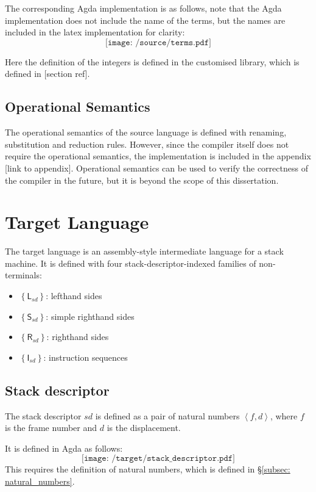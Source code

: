 \documentclass[12pt,twoside,a4paper]{report}
\theoremstyle{definition}
\theoremstyle{definition}
\theoremstyle{definition}
\theoremstyle{definition}
\newcommand{\secref}[1]{\S\ref{#1}}
\newcommand{\bracket}[1]{\left\{ #1 \right\}}
\newcommand{\ang}[1]{\left\langle #1 \right\rangle}
\begin{document}
        The corresponding Agda implementation is as follows, note that the Agda implementation does not include the name of the terms, but the names are included in the latex implementation for clarity:
        \[\texttt{[image: /source/terms.pdf]}\]

        Here the definition of the integers is defined in the customised library, which is defined in [section ref].

        \subsection{Operational Semantics}
        The operational semantics of the source language is defined with renaming, substitution and reduction rules. However, since the compiler itself does not require the operational semantics, the implementation is included in the appendix [link to appendix]. Operational semantics can be used to verify the correctness of the compiler in the future, but it is beyond the scope of this dissertation.


    \section{Target Language}
    The target language is an assembly-style intermediate language for a stack machine. It is defined with four stack-descriptor-indexed families of non-terminals: 
    \begin{itemize}
        \item 
            $\bracket{\textsf{L}_{sd}}$: lefthand sides
        \item 
            $\bracket{\textsf{S}_{sd}}$: simple righthand sides
        \item
            $\bracket{\textsf{R}_{sd}}$: righthand sides
        \item
            $\bracket{\textsf{I}_{sd}}$: instruction sequences
    \end{itemize}

    \subsection{Stack descriptor}
    The stack descriptor $sd$ is defined as a pair of natural numbers $\ang{f, d}$, where $f$ is the frame number and $d$ is the displacement. 

    It is defined in Agda as follows:
    \[\texttt{[image: /target/stack\_descriptor.pdf]}\]
    This requires the definition of natural numbers, which is defined in \secref{subsec: natural_numbers}.
\end{document}
